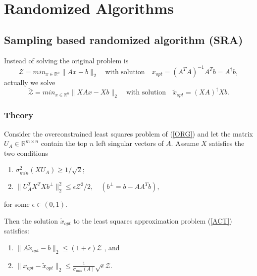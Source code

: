 \section{Randomized Algorithms}
\subsection{Sampling based randomized algorithm (SRA)}

Instead of solving the original problem is
\begin{equation}\label{ORG}
\mathcal{Z} = min_{x \in \mathbb{R}^n} \| Ax - b\|_2
\quad \text{with solution} \quad
x_{opt} = (A^T A)^{-1} A^T b = A^{\dagger} b,
\end{equation}
actually we solve
\begin{equation}\label{ACT}
\tilde{\mathcal{Z}} = min_{x \in \mathbb{R}^n} \| X Ax - X b\|_2
\quad \text{with solution} \quad
\tilde{x}_{opt} = (XA)^{\dagger} X b.
\end{equation}

\subsubsection{Theory}
\begin{lemma}
	Consider the overconstrained least squares problem of (\ref{ORG}) and let the matrix $U_A \in \mathbb{R}^{m\times n}$ contain the top $n$ left singular vectors of $A$. Assume $X$ satisfies the two conditions
	\begin{enumerate}
		\item $\sigma_{min}^2(X U_A) \geq 1/\sqrt{2}; $ \\
		\item $\| U_A^T X^T X b^{\perp}\|_2^2 \leq \epsilon \mathcal{Z}^2 /2, \quad (b^{\perp} = b - A A^T b), $
	\end{enumerate}
	for some $\epsilon \in (0,1).$
	
	Then the solution $\tilde{x}_{opt}$ to the least squares approximation problem (\ref{ACT}) satisfies:
	\begin{enumerate}
		\item $\| A \tilde{x}_{opt} - b\|_2 \leq (1+ \epsilon) \mathcal{Z} $ , and \\
		\item $\| x_{opt} - \tilde{x}_{opt} \|_2 \leq \frac{1}{\sigma_{min}(A)} \sqrt{\epsilon} \mathcal{Z}. $
	\end{enumerate}
\end{lemma}

